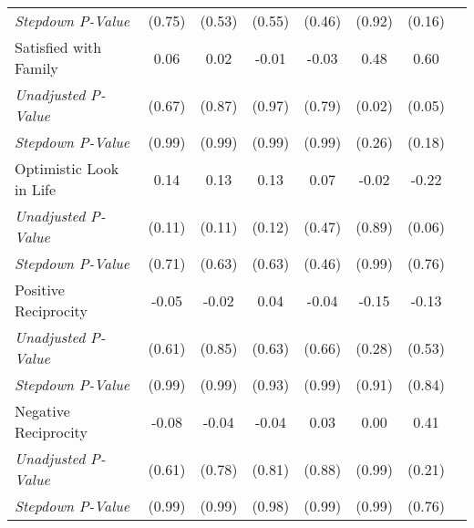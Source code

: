 \begin{tabular}{l c c c c c c c}
\quad \textit{Stepdown P-Value} & (0.75) & (0.53) & (0.55) & (0.46) & (0.92) & (0.16) \\
Satisfied with Family & 0.06 & 0.02 & -0.01 & -0.03 & 0.48 & 0.60 \\
\quad \textit{Unadjusted P-Value} & (0.67) & (0.87) & (0.97) & (0.79) & (0.02) & (0.05) \\
\quad \textit{Stepdown P-Value} & (0.99) & (0.99) & (0.99) & (0.99) & (0.26) & (0.18) \\
Optimistic Look in Life & 0.14 & 0.13 & 0.13 & 0.07 & -0.02 & -0.22 \\
\quad \textit{Unadjusted P-Value} & (0.11) & (0.11) & (0.12) & (0.47) & (0.89) & (0.06) \\
\quad \textit{Stepdown P-Value} & (0.71) & (0.63) & (0.63) & (0.46) & (0.99) & (0.76) \\
Positive Reciprocity & -0.05 & -0.02 & 0.04 & -0.04 & -0.15 & -0.13 \\
\quad \textit{Unadjusted P-Value} & (0.61) & (0.85) & (0.63) & (0.66) & (0.28) & (0.53) \\
\quad \textit{Stepdown P-Value} & (0.99) & (0.99) & (0.93) & (0.99) & (0.91) & (0.84) \\
Negative Reciprocity & -0.08 & -0.04 & -0.04 & 0.03 & 0.00 & 0.41 \\
\quad \textit{Unadjusted P-Value} & (0.61) & (0.78) & (0.81) & (0.88) & (0.99) & (0.21) \\
\quad \textit{Stepdown P-Value} & (0.99) & (0.99) & (0.98) & (0.99) & (0.99) & (0.76) \\
\bottomrule
\end{tabular}
